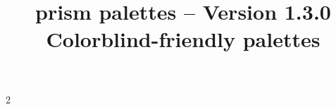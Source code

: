 \documentclass{tutodoc}
\title{\raisebox{-.20ex}{@}prism palettes -- Version 1.3.0\\ Colorblind-friendly palettes}
\date{}
\begin{document}
\maketitle{}

{
  \setlength{\columnsep}{2cm}
  \setlength{\columnseprule}{0.4pt}

  \begin{multicols}{2}
    \tableofcontents
  \end{multicols}
}

\newpage


















\end{document}
